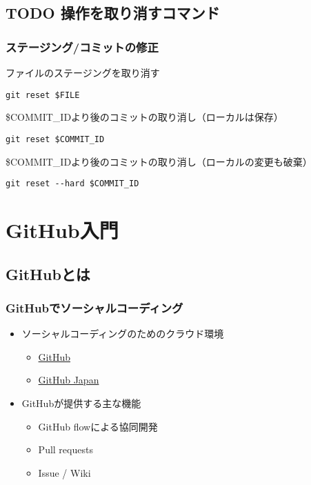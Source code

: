 \documentclass[a4paper,twoside,twocolumn]{bxjsarticle}
\begin{document}
\subsection{{\bfseries\sffamily TODO} 操作を取り消すコマンド}
\label{sec-1-7}
\subsubsection{ステージング/コミットの修正}
\label{sec-1-7-1}
ファイルのステージングを取り消す

\begin{verbatim}
git reset $FILE
\end{verbatim}

\$COMMIT\_IDより後のコミットの取り消し（ローカルは保存）

\begin{verbatim}
git reset $COMMIT_ID
\end{verbatim}

\$COMMIT\_IDより後のコミットの取り消し（ローカルの変更も破棄）

\begin{verbatim}
git reset --hard $COMMIT_ID
\end{verbatim}

\section{GitHub入門}
\label{sec-2}
\subsection{GitHubとは}
\label{sec-2-1}
\subsubsection{GitHubでソーシャルコーディング}
\label{sec-2-1-1}
\begin{itemize}
\item ソーシャルコーディングのためのクラウド環境
\begin{itemize}
\item \href{https://github.com/}{GitHub}
\item \href{http://github.co.jp/}{GitHub Japan}
\end{itemize}
\item GitHubが提供する主な機能
\begin{itemize}
\item GitHub flowによる協同開発
\item Pull requests
\item Issue / Wiki
\end{itemize}
\end{itemize}
\end{document}
